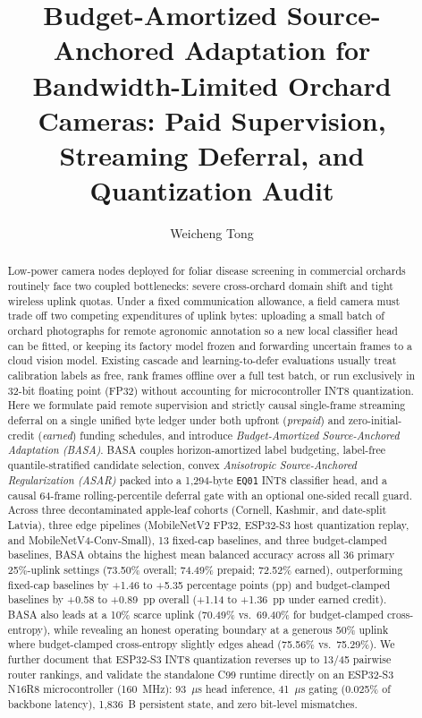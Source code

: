 \documentclass[preprint,12pt,authoryear]{elsarticle}
\begin{document}
\begin{frontmatter}

\title{Budget-Amortized Source-Anchored Adaptation for Bandwidth-Limited Orchard Cameras: Paid Supervision, Streaming Deferral, and Quantization Audit}

\author[1]{Weicheng Tong}


\begin{abstract}
Low-power camera nodes deployed for foliar disease screening in commercial orchards routinely face two coupled bottlenecks: severe cross-orchard domain shift and tight wireless uplink quotas. Under a fixed communication allowance, a field camera must trade off two competing expenditures of uplink bytes: uploading a small batch of orchard photographs for remote agronomic annotation so a new local classifier head can be fitted, or keeping its factory model frozen and forwarding uncertain frames to a cloud vision model. Existing cascade and learning-to-defer evaluations usually treat calibration labels as free, rank frames offline over a full test batch, or run exclusively in 32-bit floating point (FP32) without accounting for microcontroller INT8 quantization. Here we formulate paid remote supervision and strictly causal single-frame streaming deferral on a single unified byte ledger under both upfront (\emph{prepaid}) and zero-initial-credit (\emph{earned}) funding schedules, and introduce \emph{Budget-Amortized Source-Anchored Adaptation (BASA)}. BASA couples horizon-amortized label budgeting, label-free quantile-stratified candidate selection, convex \emph{Anisotropic Source-Anchored Regularization (ASAR)} packed into a 1,294-byte \texttt{EQ01} INT8 classifier head, and a causal 64-frame rolling-percentile deferral gate with an optional one-sided recall guard. Across three decontaminated apple-leaf cohorts (Cornell, Kashmir, and date-split Latvia), three edge pipelines (MobileNetV2 FP32, ESP32-S3 host quantization replay, and MobileNetV4-Conv-Small), 13 fixed-cap baselines, and three budget-clamped baselines, BASA obtains the highest mean balanced accuracy across all 36 primary 25\%-uplink settings (73.50\% overall; 74.49\% prepaid; 72.52\% earned), outperforming fixed-cap baselines by +1.46 to +5.35 percentage points (pp) and budget-clamped baselines by +0.58 to +0.89~pp overall (+1.14 to +1.36~pp under earned credit). BASA also leads at a 10\% scarce uplink (70.49\% vs.\ 69.40\% for budget-clamped cross-entropy), while revealing an honest operating boundary at a generous 50\% uplink where budget-clamped cross-entropy slightly edges ahead (75.56\% vs.\ 75.29\%). We further document that ESP32-S3 INT8 quantization reverses up to 13/45 pairwise router rankings, and validate the standalone C99 runtime directly on an ESP32-S3 N16R8 microcontroller (160~MHz): 93~$\mu$s head inference, 41~$\mu$s gating (0.025\% of backbone latency), 1,836~B persistent state, and zero bit-level mismatches.
\end{abstract}


\end{frontmatter}
\end{document}
